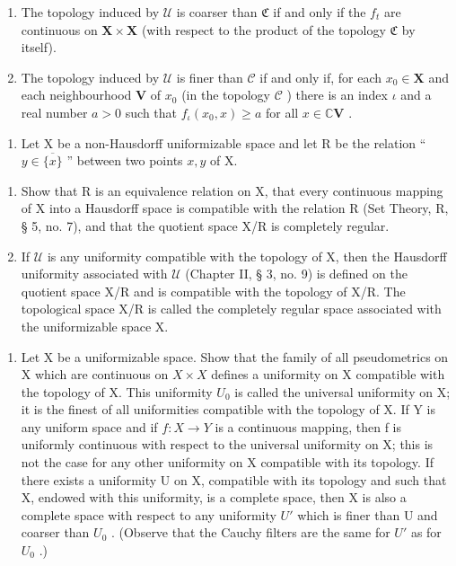 \begin{enumerate}
\def\labelenumi{\alph{enumi})}
\item
  The topology induced by \(\mathcal{U}\) is coarser than \(\mathfrak{C}\) if and only if the \(f_{t}\) are continuous on \(\mathbf{X} \times \mathbf{X}\) (with respect to the product of the topology \(\mathfrak{C}\) by itself).
\item
  The topology induced by \(\mathcal{U}\) is finer than \(\mathcal{C}\) if and only if, for each \(x_0 \in \mathbf{X}\) and each neighbourhood \(\mathbf{V}\) of \(x_0\) (in the topology \(\mathcal{C}\) ) there is an index \(\iota\) and a real number \(a > 0\) such that \(f_{\iota}(x_0, x) \geqslant a\) for all \(x \in \mathbb{C}\mathbf{V}\) .
\end{enumerate}

\begin{enumerate}
\def\labelenumi{\arabic{enumi})}
\setcounter{enumi}{3}
\tightlist
\item
  Let X be a non-Hausdorff uniformizable space and let R be the relation `` \(y \in \overline{\{x\}}\) '' between two points \(x, y\) of X.
\end{enumerate}

\begin{enumerate}
\def\labelenumi{\alph{enumi})}
\item
  Show that R is an equivalence relation on X, that every continuous mapping of X into a Hausdorff space is compatible with the relation R (Set Theory, R, § 5, no. 7), and that the quotient space X/R is completely regular.
\item
  If \(\mathcal{U}\) is any uniformity compatible with the topology of X, then the Hausdorff uniformity associated with \(\mathcal{U}\) (Chapter II, § 3, no. 9) is defined on the quotient space X/R and is compatible with the topology of X/R. The topological space X/R is called the completely regular space associated with the uniformizable space X.
\end{enumerate}

\begin{enumerate}
\def\labelenumi{\arabic{enumi})}
\setcounter{enumi}{4}
\tightlist
\item
  Let X be a uniformizable space. Show that the family of all pseudometrics on X which are continuous on \(X \times X\) defines a uniformity on X compatible with the topology of X. This uniformity \(U_{0}\) is called the universal uniformity on X; it is the finest of all uniformities compatible with the topology of X. If Y is any uniform space and if \(f: X \to Y\) is a continuous mapping, then f is uniformly continuous with respect to the universal uniformity on X; this is not the case for any other uniformity on X compatible with its topology. If there exists a uniformity U on X, compatible with its topology and such that X, endowed with this uniformity, is a complete space, then X is also a complete space with respect to any uniformity \(U'\) which is finer than U and coarser than \(U_{0}\) . (Observe that the Cauchy filters are the same for \(U'\) as for \(U_{0}\) .)
\end{enumerate}

